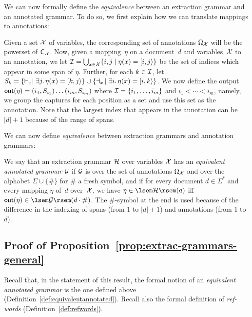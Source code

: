 We can now formally define the \emph{equivalence} between an extraction grammar
and an annotated grammar. To do so, we first explain how we can translate
mappings to annotations:

\begin{definition}
  \label{def:outputset}
Given a set $\mathcal{X}$ of variables, the corresponding set of annotations $\Omega_{\mathcal{X}}$ will be the powerset of $\textsf{C}_{\mathcal{X}}$.
Now, given a mapping~$\eta$ on a document~$d$ and variables~$\mathcal{X}$ to an annotation, we 
%
%
let $\mathcal{I} = \bigcup_{x \in \mathcal{X}} \{i, j \mid \eta(x) = [i,j\rangle\}$ be the
set of indices which appear in some span of $\eta$.
Further, for each $k \in \mathcal{I}$, let $S_k = \{\vdash_x \mid \exists j. \, \eta(x) = [k,j\rangle\} \cup \{\dashv_x \, \mid \exists i. \, \eta(x) = [i,k\rangle\}$. We now define the output $\textsf{out}(\eta) = (i_1,S_{i_1})\ldots(i_m,S_{i_m})$ where $\mathcal{I} = \{i_1,\ldots,i_m\}$ and  $i_1 < \cdots < i_m$, namely, we group the captures for each position as a set and use this set as the annotation.
Note that the largest index that appears in the annotation can be $|d|+1$ because of the range of spans.
\end{definition}

We can now define \emph{equivalence} between extraction grammars and annotation
grammars:

\begin{definition}
  \label{def:equivalentannotated}
  We say that an extraction grammar $\mathcal{H}$ over variables $\mathcal{X}$ 
has an \emph{equivalent annotated grammar} $\mathcal{G}$ if $\mathcal{G}$ is over the 
set of annotations $\Omega_{\mathcal{X}}$ and over the
alphabet $\Sigma \cup \{\#\}$
for $\#$ a fresh symbol, and
if for every document $d \in \Sigma^*$ and every mapping $\eta$ of~$d$ over~$\mathcal{X}$, we have
$\eta \in \sem{\cH}(d)$ iff $\outf(\eta) \in \sem{\cG}(d\cdot \#)$.
%
The $\#$-symbol at the end is used because of the difference in the indexing of spans (from $1$ to $|d|+1$) and annotations (from 1 to~$d$).
%
\end{definition}

\subsection{Proof of Proposition~\ref{prop:extrac-grammars-general}}

Recall that, in the statement of this result, the formal notion of an
\emph{equivalent annotated grammar} is the one defined above
(Definition~\ref{def:equivalentannotated}). Recall also the formal definition of
\emph{ref-words} (Definition~\ref{def:refwords}).

